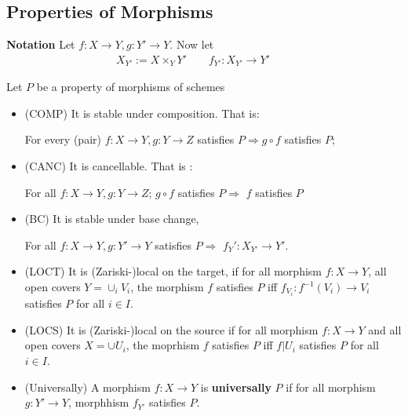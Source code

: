 \documentclass[Total.tex]{subfiles}
\begin{document}
			\subsection{Properties of Morphisms}
				\textbf{Notation} Let $f:X\rightarrow Y,g:Y'\rightarrow Y$. Now let 
				\begin{gather*}
					X_{Y'}:=X\times_Y Y'\qquad f_{Y'}:X_{Y'}\rightarrow Y'\qquad 
				\end{gather*}
				\begin{center}
				\end{center}
				\begin{Def}
					Let $P$ be a property of morphisms of schemes 
					\begin{itemize}
						\item (COMP) It is stable under composition. That is: 
						\begin{center}
							For every (pair) $f:X\rightarrow Y,g:Y\rightarrow Z$ satisfies $P\Rightarrow g\circ f$ satisfies $P$;
						\end{center}
						\item (CANC) It is cancellable. That is :
						\begin{center}
							 For all $f:X\rightarrow Y,g:Y\rightarrow Z$; $g\circ f$ satisfies $P$$\Rightarrow$ $f$ satisfies $P$
						\end{center} 
						
						\item (BC) It is stable under base change, 
						\begin{center}
							For all $f:X\rightarrow Y,g:Y'\rightarrow Y$ satisfies $P$$\Rightarrow$  $f_Y':X_{Y'}\rightarrow Y'$.
						\end{center}
						\item (LOCT) It is (Zariski-)local on the target, if for all morphism $f:X\rightarrow Y$, all open covers $Y=\cup_i V_i$, the morphism $f$ satisfies $P$ iff $f_{V_i}:f^{-1}(V_i)\rightarrow V_i$ satisfies $P$ for all $i\in I$.
						\item (LOCS) It is (Zariski-)local on the source if for all morphism $f:X\rightarrow Y$ and all open covers $X=\cup U_i$, the moprhism $f$ satisfies $P$ iff $f|U_i$ satisfies $P$ for all $i\in I$.
						\item (Universally) A morphism $f:X\rightarrow Y$ is \textbf{universally} $P$ if for all morphism $g:Y'\rightarrow Y$, morphhism $f_{Y'}$ satisfies $P$.
					\end{itemize}
				\end{Def}
				
\end{document}

